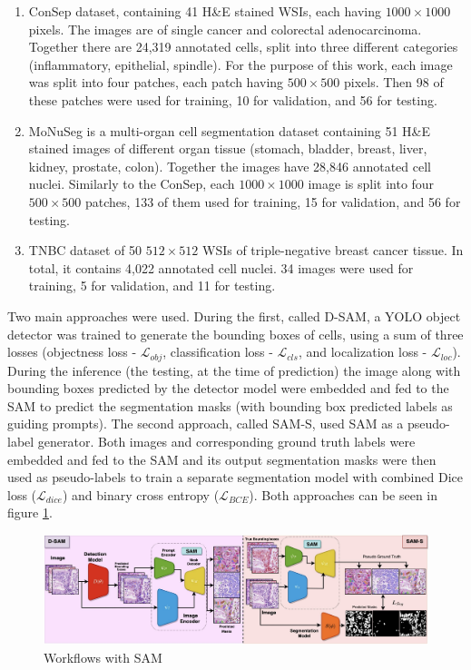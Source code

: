 \begin{enumerate}
    \item ConSep dataset, containing 41 H\&E stained WSIs, each having $1000\!\times\!1000$ pixels. The images are of single cancer and colorectal adenocarcinoma. Together there are 24,319 annotated cells, split into three different categories (inflammatory, epithelial, spindle). For the purpose of this work, each image was split into four patches, each patch having $500\!\times\!500$ pixels. Then 98 of these patches were used for training, 10 for validation, and 56 for testing.
    \item MoNuSeg is a multi-organ cell segmentation dataset containing 51 H\&E stained images of different organ tissue (stomach, bladder, breast, liver, kidney, prostate, colon). Together the images have 28,846 annotated cell nuclei. Similarly to the ConSep, each $1000\!\times\!1000$ image is split into four $500\!\times\!500$ patches, 133 of them used for training, 15 for validation, and 56 for testing.
    \item TNBC dataset of 50 $512\!\times\!512$ WSIs of triple-negative breast cancer tissue. In total, it contains 4,022 annotated cell nuclei. 34 images were used for training, 5 for validation, and 11 for testing.
\end{enumerate}

Two main approaches were used. During the first, called D-SAM, a YOLO object detector was trained to generate the bounding boxes of cells, using a sum of three losses (objectness loss - $\mathcal{L}_{obj}$, classification loss - $\mathcal{L}_{cls}$, and localization loss - $\mathcal{L}_{loc}$). During the inference (the testing, at the time of prediction) the image along with bounding boxes predicted by the detector model were embedded and fed to the SAM to predict the segmentation masks (with bounding box predicted labels as guiding prompts). The second approach, called SAM-S, used SAM as a pseudo-label generator. Both images and corresponding ground truth labels were embedded and fed to the SAM and its output segmentation masks were then used as pseudo-labels to train a separate segmentation model with combined Dice loss ($\mathcal{L}_{dice}$) and binary cross entropy ($\mathcal{L}_{BCE}$). Both approaches can be seen in figure \ref{fig:rw-sam}. 

\begin{figure}[H]
    \begin{centering}
    \includegraphics[width=14cm]{assets/images/rw-sam.png}
    \par\end{centering}
    \caption{Workflows with SAM \cite{Shamshad2023}}
    \label{fig:rw-sam}
\end{figure}

